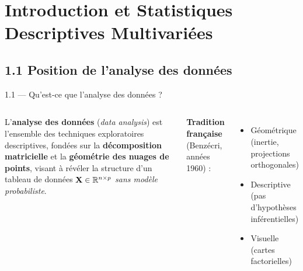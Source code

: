 \section{Introduction et Statistiques Descriptives Multivariées}

\subsection{1.1 Position de l'analyse des données}
\begin{frame}{1.1 — Qu'est-ce que l'analyse des données ?}
\begin{columns}[T]
\begin{definition}
L'\textbf{analyse des données} (\textit{data analysis}) est l'ensemble des
techniques exploratoires \alert{descriptives}, fondées sur la
\textbf{décomposition matricielle} et la \textbf{géométrie des nuages de points},
visant à révéler la structure d'un tableau de données
$\mathbf{X} \in \mathbb{R}^{n \times p}$ \emph{sans modèle probabiliste}.
\end{definition}

\vspace{0.3cm}
\textbf{Tradition française} (Benzécri, années 1960) :
\begin{itemize}\small
  \item \alert{Géométrique} (inertie, projections orthogonales)
  \item \alert{Descriptive} (pas d'hypothèses inférentielles)
  \item \alert{Visuelle} (cartes factorielles)
\end{itemize}
\end{columns}
\end{frame}

